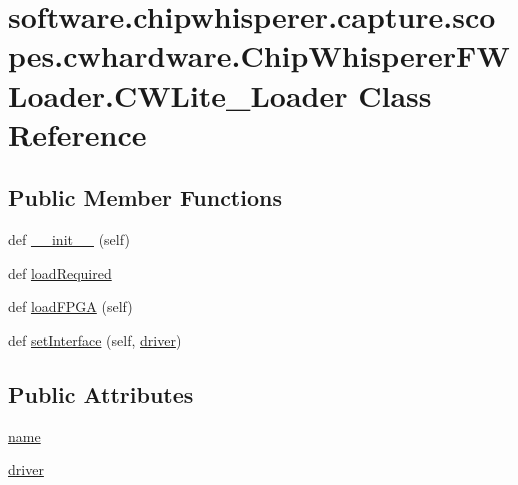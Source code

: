 \hypertarget{classsoftware_1_1chipwhisperer_1_1capture_1_1scopes_1_1cwhardware_1_1ChipWhispererFWLoader_1_1CWLite__Loader}{}\section{software.\+chipwhisperer.\+capture.\+scopes.\+cwhardware.\+Chip\+Whisperer\+F\+W\+Loader.\+C\+W\+Lite\+\_\+\+Loader Class Reference}
\label{classsoftware_1_1chipwhisperer_1_1capture_1_1scopes_1_1cwhardware_1_1ChipWhispererFWLoader_1_1CWLite__Loader}
\subsection*{Public Member Functions}
\begin{DoxyCompactItemize}
\item 
def \hyperlink{classsoftware_1_1chipwhisperer_1_1capture_1_1scopes_1_1cwhardware_1_1ChipWhispererFWLoader_1_1CWLite__Loader_a6a7d0d14f58ac524be4f39391236f815}{\+\_\+\+\_\+init\+\_\+\+\_\+} (self)
\item 
def \hyperlink{classsoftware_1_1chipwhisperer_1_1capture_1_1scopes_1_1cwhardware_1_1ChipWhispererFWLoader_1_1CWLite__Loader_a4404c57f8d7592a5652672c73ac364f3}{load\+Required}
\item 
def \hyperlink{classsoftware_1_1chipwhisperer_1_1capture_1_1scopes_1_1cwhardware_1_1ChipWhispererFWLoader_1_1CWLite__Loader_a69137d3edd06bc2b0d85a0d42684ff90}{load\+F\+P\+G\+A} (self)
\item 
def \hyperlink{classsoftware_1_1chipwhisperer_1_1capture_1_1scopes_1_1cwhardware_1_1ChipWhispererFWLoader_1_1CWLite__Loader_a78dff3dfb1acb8a58d38865632af4bc7}{set\+Interface} (self, \hyperlink{classsoftware_1_1chipwhisperer_1_1capture_1_1scopes_1_1cwhardware_1_1ChipWhispererFWLoader_1_1CWLite__Loader_abc68568b29fd9e39242f6a04f804cdcc}{driver})
\end{DoxyCompactItemize}
\subsection*{Public Attributes}
\begin{DoxyCompactItemize}
\item 
\hyperlink{classsoftware_1_1chipwhisperer_1_1capture_1_1scopes_1_1cwhardware_1_1ChipWhispererFWLoader_1_1CWLite__Loader_a1e8d274fe0bb5445ee81c428d6b4905f}{name}
\item 
\hyperlink{classsoftware_1_1chipwhisperer_1_1capture_1_1scopes_1_1cwhardware_1_1ChipWhispererFWLoader_1_1CWLite__Loader_abc68568b29fd9e39242f6a04f804cdcc}{driver}
\end{DoxyCompactItemize}


